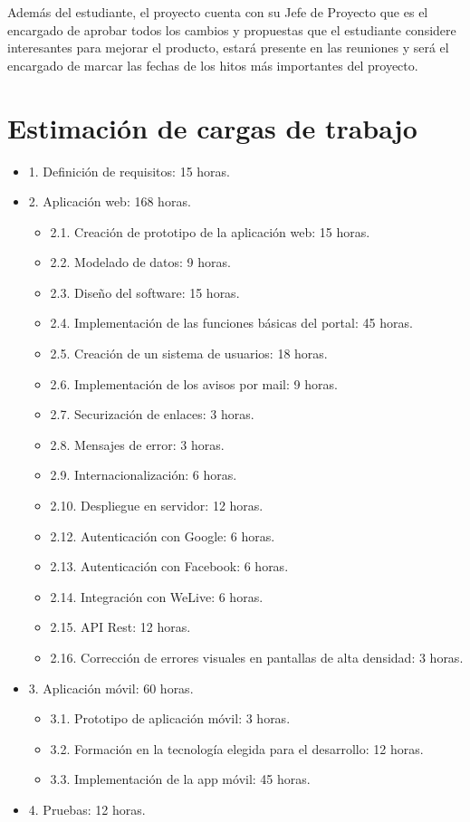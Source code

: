 \documentclass{DeustoFDP}
\begin{document}
Además del estudiante, el proyecto cuenta con su Jefe de Proyecto que es el encargado de aprobar todos los cambios y propuestas que el estudiante considere interesantes para mejorar el producto, estará presente en las reuniones y será el encargado de marcar las fechas de los hitos más importantes del proyecto.

\section{Estimación de cargas de trabajo}
\begin{itemize}
    \item 1. Definición de requisitos: 15 horas.
    \item 2. Aplicación web: 168 horas.
    \begin{itemize}
        \item 2.1. Creación de prototipo de la aplicación web: 15 horas.
        \item 2.2. Modelado de datos: 9 horas.
        \item 2.3. Diseño del software: 15 horas.
        \item 2.4. Implementación de las funciones básicas del portal: 45 horas.
        \item 2.5. Creación de un sistema de usuarios: 18 horas.
        \item 2.6. Implementación de los avisos por mail: 9 horas.
        \item 2.7. Securización de enlaces: 3 horas.
        \item 2.8. Mensajes de error: 3 horas.
        \item 2.9. Internacionalización: 6 horas.
        \item 2.10. Despliegue en servidor: 12 horas.
        \item 2.12. Autenticación con Google: 6 horas.
        \item 2.13. Autenticación con Facebook: 6 horas.
        \item 2.14. Integración con WeLive: 6 horas.
        \item 2.15. API Rest: 12 horas.
        \item 2.16. Corrección de errores visuales en pantallas de alta densidad: 3 horas.
    \end{itemize}
    \item 3. Aplicación móvil: 60 horas.
    \begin{itemize}
        \item 3.1. Prototipo de aplicación móvil: 3 horas.
        \item 3.2. Formación en la tecnología elegida para el desarrollo: 12 horas.
        \item 3.3. Implementación de la app móvil: 45 horas.
    \end{itemize}
    \item 4. Pruebas: 12 horas.
\end{itemize}
\end{document}
